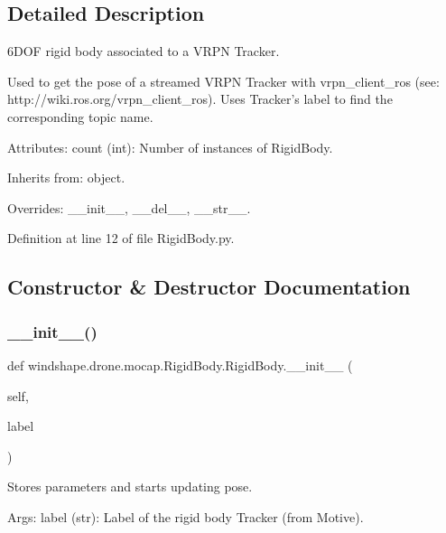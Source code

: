 \subsection{Detailed Description}
\begin{DoxyVerb}6DOF rigid body associated to a VRPN Tracker.

Used to get the pose of a streamed VRPN Tracker with vrpn_client_ros
(see: http://wiki.ros.org/vrpn_client_ros). Uses Tracker's label to
find the corresponding topic name.

Attributes:
    count (int): Number of instances of RigidBody.

Inherits from: object.

Overrides: __init__, __del__, __str__.
\end{DoxyVerb}
 

Definition at line 12 of file Rigid\+Body.\+py.



\subsection{Constructor \& Destructor Documentation}
\mbox{\label{classwindshape_1_1drone_1_1mocap_1_1_rigid_body_1_1_rigid_body_a2804ab5c7a3a61772342037b39fe4eb0}} 
\subsubsection{\texorpdfstring{\+\_\+\+\_\+init\+\_\+\+\_\+()}{\_\_init\_\_()}}
{\footnotesize\ttfamily def windshape.\+drone.\+mocap.\+Rigid\+Body.\+Rigid\+Body.\+\_\+\+\_\+init\+\_\+\+\_\+ (\begin{DoxyParamCaption}\item[{}]{self,  }\item[{}]{label }\end{DoxyParamCaption})}

\begin{DoxyVerb}Stores parameters and starts updating pose.

Args:
    label (str): Label of the rigid body Tracker (from Motive).
\end{DoxyVerb}
 

